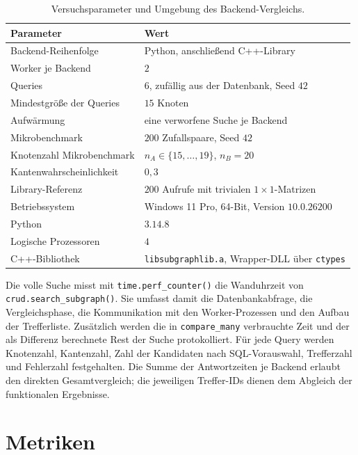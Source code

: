 \documentclass[a4paper,12pt, twoside]{report}
\theoremstyle{definition}
\begin{document}
\begin{table}[h]
	\centering
	\small
	\caption{Versuchsparameter und Umgebung des Backend-Vergleichs.}
	\label{tab:backend_setup}
	\begin{tabular}{@{}ll@{}}
		\toprule
		Parameter & Wert \\
		\midrule
		Backend-Reihenfolge & Python, anschließend C++-Library \\
		Worker je Backend & $2$ \\
		Queries & $6$, zufällig aus der Datenbank, Seed $42$ \\
		Mindestgröße der Queries & $15$ Knoten \\
		Aufwärmung & eine verworfene Suche je Backend \\
		Mikrobenchmark & $200$ Zufallspaare, Seed $42$ \\
		Knotenzahl Mikrobenchmark & $n_A\in\{15,\ldots,19\}$, $n_B=20$ \\
		Kantenwahrscheinlichkeit & $0{,}3$ \\
		Library-Referenz & $200$ Aufrufe mit trivialen $1\times1$-Matrizen \\
		Betriebssystem & Windows 11 Pro, 64-Bit, Version $10.0.26200$ \\
		Python & $3.14.8$ \\
		Logische Prozessoren & $4$ \\
		C++-Bibliothek & \texttt{libsubgraphlib.a}, Wrapper-DLL über \texttt{ctypes} \\
		\bottomrule
	\end{tabular}
\end{table}

Die volle Suche misst mit \texttt{time.perf\_counter()} die Wanduhrzeit von \texttt{crud.search\_subgraph()}. Sie umfasst damit die Datenbankabfrage, die Vergleichsphase, die Kommunikation mit den Worker-Prozessen und den Aufbau der Trefferliste. Zusätzlich werden die in \texttt{compare\_many} verbrauchte Zeit und der als Differenz berechnete Rest der Suche protokolliert. Für jede Query werden Knotenzahl, Kantenzahl, Zahl der Kandidaten nach SQL-Vorauswahl, Trefferzahl und Fehlerzahl festgehalten. Die Summe der Antwortzeiten je Backend erlaubt den direkten Gesamtvergleich; die jeweiligen Treffer-IDs dienen dem Abgleich der funktionalen Ergebnisse.

\section{Metriken}
\label{sec:backend_metriken}
\end{document}
